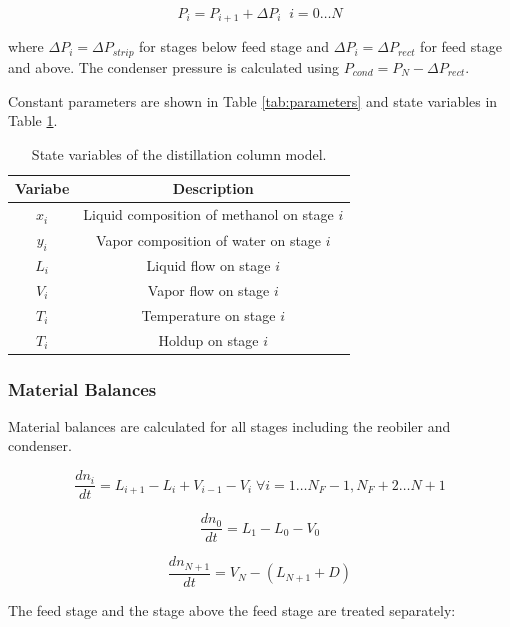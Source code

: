\begin{equation}
    P_i = P_{i+1} + \Delta P_i \;\; i=0\dots N
\end{equation}

where $\Delta P_i =\Delta P_{strip}$ for stages below feed stage and $\Delta P_i =\Delta P_{rect}$ for feed stage and above. The condenser pressure is calculated using $P_{cond}=P_{N} - \Delta P_{rect}$.

Constant parameters are shown in Table \ref{tab:parameters} and state variables in Table \ref{tab:state_variables}.
\begin{table}
    \centering
    \caption{State variables of the distillation column model.}
    \begin{tabular}{cc}
        \textbf{Variabe} & \textbf{Description}  \\
        \hline
         $x_i$ &  Liquid composition of methanol on stage $i$ \\
         $y_i$ & Vapor composition of water on stage $i$\\
         $L_i$ & Liquid flow on stage $i$  \\
         $V_i$  & Vapor flow on stage $i$ \\
         $T_i$  & Temperature on stage $i$ \\
         $T_i$  & Holdup on stage $i$ \\
    \end{tabular}
    
    \label{tab:state_variables}
\end{table}

\subsubsection{Material Balances}
Material balances are calculated for all stages including the reobiler and condenser.

\begin{equation}
\frac{dn_i}{dt} = L_{i+1}-L_i + V_{i-1}-V_i \; \forall i=1 \dots N_F-1, N_F+2 \dots N+1
\end{equation}

\begin{equation}
   \frac{dn_0}{dt} = L_1 - L_0 - V_0 
\end{equation}


\begin{equation}
    \frac{dn_{N+1}}{dt} = V_{N}-(L_{N+1} + D)    
\end{equation}

The  feed stage and the stage above the feed stage are treated separately:

